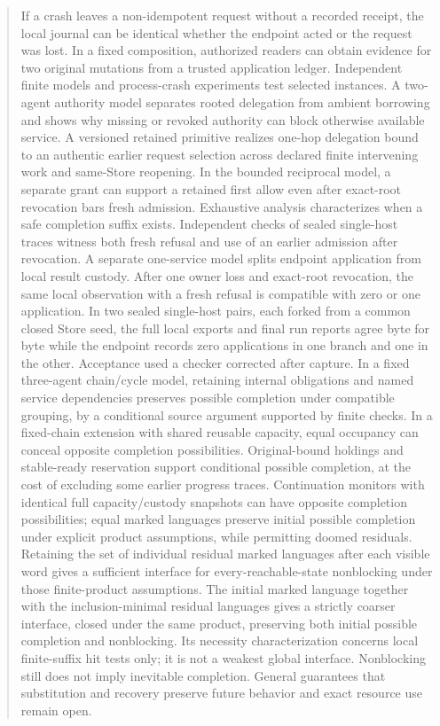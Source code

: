 \documentclass[11pt,a4paper]{article}
\theoremstyle{definition}
\theoremstyle{remark}
\begin{document}
\begin{abstract}
If a crash leaves a non-idempotent request without a recorded receipt, the local journal can be identical whether the endpoint acted or the request was lost. In a fixed composition, authorized readers can obtain evidence for two original mutations from a trusted application ledger. Independent finite models and process-crash experiments test selected instances. A two-agent authority model separates rooted delegation from ambient borrowing and shows why missing or revoked authority can block otherwise available service. A versioned retained primitive realizes one-hop delegation bound to an authentic earlier request selection across declared finite intervening work and same-Store reopening. In the bounded reciprocal model, a separate grant can support a retained first allow even after exact-root revocation bars fresh admission. Exhaustive analysis characterizes when a safe completion suffix exists. Independent checks of sealed single-host traces witness both fresh refusal and use of an earlier admission after revocation. A separate one-service model splits endpoint application from local result custody. After one owner loss and exact-root revocation, the same local observation with a fresh refusal is compatible with zero or one application. In two sealed single-host pairs, each forked from a common closed Store seed, the full local exports and final run reports agree byte for byte while the endpoint records zero applications in one branch and one in the other. Acceptance used a checker corrected after capture. In a fixed three-agent chain/cycle model, retaining internal obligations and named service dependencies preserves possible completion under compatible grouping, by a conditional source argument supported by finite checks. In a fixed-chain extension with shared reusable capacity, equal occupancy can conceal opposite completion possibilities. Original-bound holdings and stable-ready reservation support conditional possible completion, at the cost of excluding some earlier progress traces. Continuation monitors with identical full capacity/custody snapshots can have opposite completion possibilities; equal marked languages preserve initial possible completion under explicit product assumptions, while permitting doomed residuals. Retaining the set of individual residual marked languages after each visible word gives a sufficient interface for every-reachable-state nonblocking under those finite-product assumptions. The initial marked language together with the inclusion-minimal residual languages gives a strictly coarser interface, closed under the same product, preserving both initial possible completion and nonblocking. Its necessity characterization concerns local finite-suffix hit tests only; it is not a weakest global interface. Nonblocking still does not imply inevitable completion. General guarantees that substitution and recovery preserve future behavior and exact resource use remain open.
\end{abstract}
\end{document}
